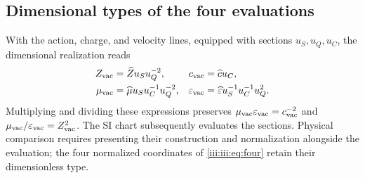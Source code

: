 \subsection{Dimensional types of the four evaluations}

With the action, charge, and velocity lines, equipped with sections
$u_S,u_Q,u_C$, the dimensional realization reads
\begin{align}
 Z_{\rm vac}&=\widehat Z u_Su_Q^{-2},&
 c_{\rm vac}&=\widehat c u_C,\\
 \mu_{\rm vac}&=\widehat\mu u_Su_C^{-1}u_Q^{-2},&
 \varepsilon_{\rm vac}&=\widehat\varepsilon u_S^{-1}u_C^{-1}u_Q^2.
 \label{iii:iii:eq:dimensions}
\end{align}
Multiplying and dividing these expressions preserves
$\mu_{\rm vac}\varepsilon_{\rm vac}=c_{\rm vac}^{-2}$ and
$\mu_{\rm vac}/\varepsilon_{\rm vac}=Z_{\rm vac}^2$.
The SI chart subsequently evaluates the sections. Physical comparison requires
presenting their construction and normalization alongside the evaluation; the four
normalized coordinates of \eqref{iii:iii:eq:four} retain their dimensionless type.
